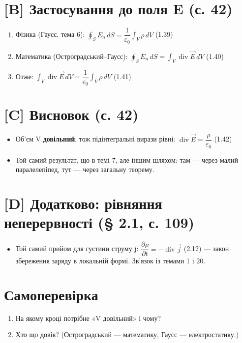 \documentclass[11pt,a4paper,oneside]{book}
\begin{document}
\section*{[B] Застосування до поля E (с. 42)}
\begin{enumerate}
\item Фізика (Гаусс, тема 6): $\oint_S E_n\,dS = \dfrac1{\varepsilon_0}\int_V\rho\,dV$ (1.39)
\item Математика (Остроградський–Гаусс): $\oint_S E_n\,dS = \int_V\operatorname{div}\vec E\,dV$ (1.40)
\item Отже: $\int_V\operatorname{div}\vec E\,dV = \dfrac1{\varepsilon_0}\int_V\rho\,dV$ (1.41)
\end{enumerate}

\section*{[C] Висновок (с. 42)}
\begin{itemize}
\item Об'єм V \textbf{довільний}, тож підінтегральні вирази рівні: $\operatorname{div}\vec E = \dfrac{\rho}{\varepsilon_0}$ (1.42)
\item Той самий результат, що в темі 7, але іншим шляхом: там — через малий паралелепіпед, тут — через загальну теорему.
\end{itemize}

\section*{[D] Додатково: рівняння неперервності (§ 2.1, с. 109)}
\begin{itemize}
\item Той самий прийом для густини струму j: $\dfrac{\partial\rho}{\partial t} = -\operatorname{div}\vec j$ (2.12) — закон збереження заряду в локальній формі. Зв'язок із темами 1 і 20.
\end{itemize}

\section*{Самоперевірка}
\begin{enumerate}
\item На якому кроці потрібне «V довільний» і чому?
\item Хто що довів? (Остроградський — математику, Гаусс — електростатику.)
\end{enumerate}
\end{document}

